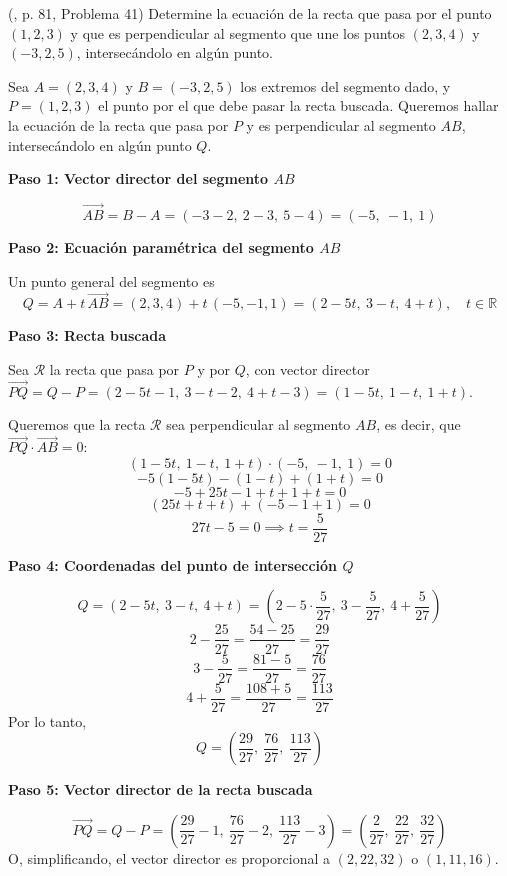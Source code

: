 \begin{prob} (\cite{espinoza2006Algebralineal}, p. 81, Problema 41) Determine la ecuación de la recta que pasa por el punto $(1,2,3)$ y que es perpendicular al segmento que une los puntos $(2,3,4)$ y $(-3,2,5)$, intersecándolo en algún punto.
\begin{myproof}
Sea $A = (2,3,4)$ y $B = (-3,2,5)$ los extremos del segmento dado, y $P = (1,2,3)$ el punto por el que debe pasar la recta buscada. Queremos hallar la ecuación de la recta que pasa por $P$ y es perpendicular al segmento $AB$, intersecándolo en algún punto $Q$.

\textbf{Paso 1: Vector director del segmento $AB$}

\[
\vec{AB} = B - A = (-3 - 2,\ 2 - 3,\ 5 - 4) = (-5,\ -1,\ 1)
\]

\textbf{Paso 2: Ecuación paramétrica del segmento $AB$}

Un punto general del segmento es
\[
Q = A + t\,\vec{AB} = (2,3,4) + t\,(-5,-1,1) = (2-5t,\ 3-t,\ 4+t), \quad t \in \mathbb{R}
\]

\textbf{Paso 3: Recta buscada}

Sea $\mathcal{R}$ la recta que pasa por $P$ y por $Q$, con vector director $\vec{PQ} = Q - P = (2-5t-1,\ 3-t-2,\ 4+t-3) = (1-5t,\ 1-t,\ 1+t)$.

Queremos que la recta $\mathcal{R}$ sea perpendicular al segmento $AB$, es decir, que $\vec{PQ} \cdot \vec{AB} = 0$:
\[
(1-5t,\ 1-t,\ 1+t) \cdot (-5,\ -1,\ 1) = 0
\]
\[
-5(1-5t) - (1-t) + (1+t) = 0
\]
\[
-5 + 25t - 1 + t + 1 + t = 0
\]
\[
(25t + t + t) + (-5 - 1 + 1) = 0
\]
\[
27t - 5 = 0 \implies t = \frac{5}{27}
\]

\textbf{Paso 4: Coordenadas del punto de intersección $Q$}

\[
Q = (2 - 5t,\ 3 - t,\ 4 + t) = \left(2 - 5 \cdot \frac{5}{27},\ 3 - \frac{5}{27},\ 4 + \frac{5}{27}\right)
\]
\[
2 - \frac{25}{27} = \frac{54 - 25}{27} = \frac{29}{27}
\]
\[
3 - \frac{5}{27} = \frac{81 - 5}{27} = \frac{76}{27}
\]
\[
4 + \frac{5}{27} = \frac{108 + 5}{27} = \frac{113}{27}
\]
Por lo tanto,
\[
Q = \left(\frac{29}{27},\ \frac{76}{27},\ \frac{113}{27}\right)
\]

\textbf{Paso 5: Vector director de la recta buscada}

\[
\vec{PQ} = Q - P = \left(\frac{29}{27} - 1,\ \frac{76}{27} - 2,\ \frac{113}{27} - 3\right) = \left(\frac{2}{27},\ \frac{22}{27},\ \frac{32}{27}\right)
\]
O, simplificando, el vector director es proporcional a $(2,22,32)$ o $(1,11,16)$.


\end{myproof}
\end{prob}
